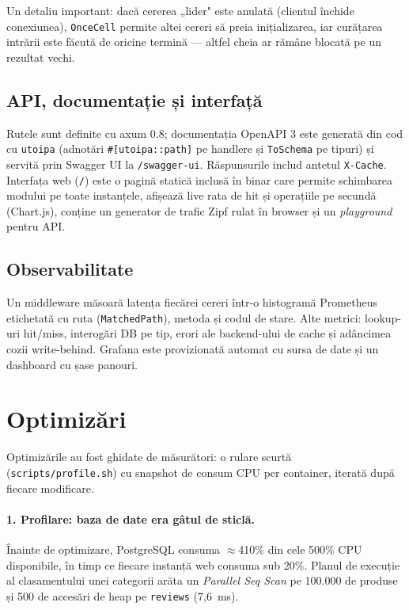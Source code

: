 Un detaliu important: dacă cererea „lider" este anulată (clientul închide conexiunea), \texttt{OnceCell}
permite altei cereri să preia inițializarea, iar curățarea intrării este făcută de oricine termină —
altfel cheia ar rămâne blocată pe un rezultat vechi.

\subsection{API, documentație și interfață}

Rutele sunt definite cu axum 0.8; documentația OpenAPI 3 este generată din cod cu \texttt{utoipa}
(adnotări \texttt{\#[utoipa::path]} pe handlere și \texttt{ToSchema} pe tipuri) și servită prin Swagger UI
la \texttt{/swagger-ui}. Răspunsurile includ antetul \texttt{X-Cache}. Interfața web (\texttt{/}) este o
pagină statică inclusă în binar care permite schimbarea modului pe toate instanțele, afișează live rata de
hit și operațiile pe secundă (Chart.js), conține un generator de trafic Zipf rulat în browser și un
\emph{playground} pentru API.

\subsection{Observabilitate}

Un middleware măsoară latența fiecărei cereri într-o histogramă Prometheus etichetată cu ruta
(\texttt{MatchedPath}), metoda și codul de stare. Alte metrici: lookup-uri hit/miss, interogări DB pe tip,
erori ale backend-ului de cache și adâncimea cozii write-behind. Grafana este provizionată automat cu
sursa de date și un dashboard cu șase panouri.

\section{Optimizări}
\label{sec:optimizari}

Optimizările au fost ghidate de măsurători: o rulare scurtă (\texttt{scripts/profile.sh}) cu snapshot
de consum CPU per container, iterată după fiecare modificare.
\ifdefined\OptTable\OptTable\fi

\paragraph{1. Profilare: baza de date era gâtul de sticlă.} Înainte de optimizare, PostgreSQL consuma
$\approx$410\% din cele 500\% CPU disponibile, în timp ce fiecare instanță web consuma sub 20\%. Planul de
execuție al clasamentului unei categorii arăta un \emph{Parallel Seq Scan} pe 100.000 de produse și 500 de
accesări de heap pe \texttt{reviews} (7{,}6~ms).


